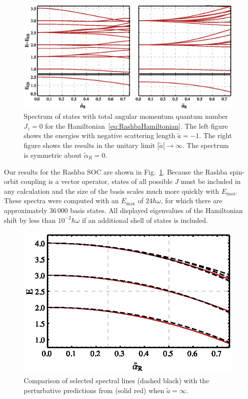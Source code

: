 \begin{figure}
\centering
\includegraphics{SOC/Figures/RashbaSpectrum}
\caption[Spectrum of the Rashba spin-orbit coupling for $J_z=0$]{\label{fig:RashbaSpectrum}  Spectrum of states with total angular momentum quantum number $J_z=0$ for the Hamiltonian~\eqref{eq:RashbaHamiltonian}. The left figure shows the energies with negative scattering length $\tilde{a}=-1$. The right figure shows the results in the unitary limit $|\tilde{a}|\rightarrow\infty$. The spectrum is symmetric about $\tilde{\alpha}_R=0$.} 
\end{figure}


Our results for the Rashba SOC are shown in Fig.~\ref{fig:RashbaSpectrum}. Because the Rashba spin-orbit coupling is a vector operator, states of all possible $J$ must be included in any calculation and the size of the basis scales much more quickly with $E_{\text{max}}$. These spectra were computed with an $E_{\text{max}}$ of $24\hbar\omega$, for which there are approximately $36\,000$ basis states. All displayed eigenvalues of the Hamiltonian shift by less than $10^{-2}\hbar\omega$ if an additional shell of states is included.

\begin{figure}
\centering
\includegraphics[scale=1.2]{SOC/Figures/PerturbativeComparison}
\caption[Comparison of the Rashba spectrum with perturbative predictions]{\label{fig:ComparisonSpectrum}Comparison of selected spectral lines (dashed black) with the perturbative predictions from \cite{PhysRevA.89.033606} (solid red) when $\tilde{a}=\infty$. }
\end{figure}

